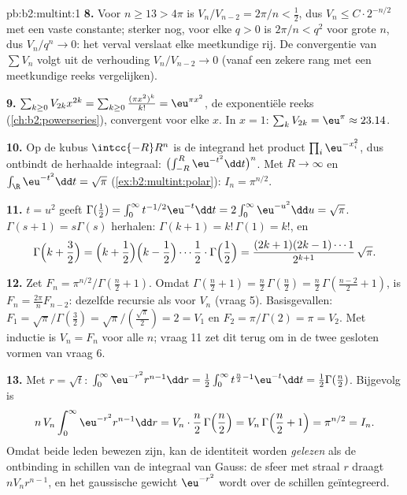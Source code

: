 \begin{solution}{pb:b2:multint:1}
\textbf{8.} Voor $n \geq 13 > 4\pi$ is $V_n/V_{n-2} = 2\pi/n <
\tfrac12$, dus $V_{n} \leq C\cdot 2^{-n/2}$ met een vaste
constante; sterker nog, voor elke $q > 0$ is $2\pi/n < q^2$ voor
grote $n$, dus $V_n/q^n \to 0$: het verval verslaat elke
meetkundige rij. De convergentie van $\sum V_n$ volgt uit de
verhouding $V_n/V_{n-2} \to 0$ (vanaf een zekere rang met een
meetkundige reeks vergelijken).

\textbf{9.} $\sum_{k\geq0}V_{2k}x^{2k} = \sum_{k\geq0}\frac{(\pi
x^2)^k}{k!} = \eu^{\pi x^2}$, de exponentiële reeks
(\cref{ch:b2:powerseries}), convergent voor elke $x$. In $x = 1$:
$\sum_kV_{2k} = \eu^\pi \approx 23.14$.

\textbf{10.} Op de kubus $\intcc{-R}R^n$ is de integrand het
product $\prod_i\eu^{-x_i^2}$, dus ontbindt de herhaalde integraal:
$\bigl(\int_{-R}^R\eu^{-t^2}\dd t\bigr)^n$. Met $R \to \infty$ en
$\int_\R\eu^{-t^2}\dd t = \sqrt\pi$
(\cref{ex:b2:multint:polar}): $I_n = \pi^{n/2}$.

\textbf{11.} $t = u^2$ geeft $\Gamma(\tfrac12) = \int_0^\infty
t^{-1/2}\eu^{-t}\dd t = 2\int_0^\infty\eu^{-u^2}\dd u = \sqrt\pi$.
$\Gamma(s+1) = s\Gamma(s)$ herhalen: $\Gamma(k+1) = k!\,\Gamma(1) =
k!$, en
\[
\Gamma\Bigl(k + \frac32\Bigr)
= \Bigl(k + \frac12\Bigr)\Bigl(k - \frac12\Bigr)\cdots
\frac12\cdot\Gamma\Bigl(\frac12\Bigr)
= \frac{(2k+1)(2k-1)\cdots1}{2^{k+1}}\,\sqrt\pi .
\]

\textbf{12.} Zet $F_n = \pi^{n/2}/\Gamma(\frac n2 + 1)$. Omdat
$\Gamma(\frac n2 + 1) = \frac n2\,\Gamma(\frac n2) = \frac
n2\,\Gamma(\frac{n-2}2 + 1)$, is $F_n = \frac{2\pi}nF_{n-2}$:
dezelfde recursie als voor $V_n$ (vraag 5). Basisgevallen: $F_1 =
\sqrt\pi/\Gamma(\frac32) = \sqrt\pi/(\frac{\sqrt\pi}2) = 2 = V_1$
en $F_2 = \pi/\Gamma(2) = \pi = V_2$. Met inductie is $V_n = F_n$
voor alle $n$; vraag 11 zet dit terug om in de twee gesloten vormen
van vraag 6.

\textbf{13.} Met $r = \sqrt t$: $\int_0^\infty \eu^{-r^2}r^{n-1}\dd
r = \frac12\int_0^\infty t^{\frac n2 - 1}\eu^{-t}\dd t =
\frac12\Gamma(\frac n2)$. Bijgevolg is
\[
n\,V_n\int_0^\infty\eu^{-r^2}r^{n-1}\dd r
= V_n\cdot\frac n2\,\Gamma\Bigl(\frac n2\Bigr)
= V_n\,\Gamma\Bigl(\frac n2 + 1\Bigr) = \pi^{n/2} = I_n .
\]
Omdat beide leden bewezen zijn, kan de identiteit worden
\emph{gelezen} als de ontbinding in schillen van de integraal van
Gauss: de sfeer met straal $r$ draagt  $nV_nr^{n-1}$, en
het gaussische gewicht $\eu^{-r^2}$ wordt over de schillen
geïntegreerd.


\end{solution}
